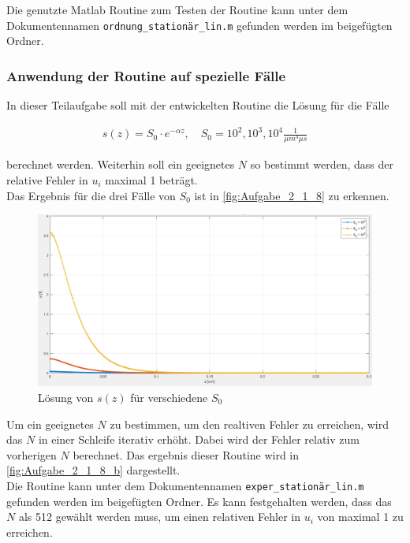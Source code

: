 \documentclass[
	pagesize,
	fontsize=12pt,
	paper=a4,
	oneside,
   reqno
]{scrartcl}
\begin{document}
Die genutzte Matlab Routine zum Testen der Routine kann unter dem Dokumentennamen \texttt{ordnung\_stationär\_lin.m} gefunden werden im beigefügten Ordner.

\subsubsection{Anwendung der Routine auf spezielle Fälle}

In dieser Teilaufgabe soll mit der entwickelten Routine die Lösung für die Fälle

\begin{align*}
   s(z) = S_0 \cdot e^{-\alpha z}, \quad S_0 = 10^2, 10^3, 10^4 \frac{1}{\mu m^3 \mu s}
\end{align*}

berechnet werden. Weiterhin soll ein geeignetes $N$ so bestimmt werden, dass der relative Fehler in $u_i$ maximal 1\textperthousand{} beträgt. \\

Das Ergebnis für die drei Fälle von $S_0$ ist in \autoref{fig:Aufgabe_2_1_8} zu erkennen.

\begin{figure}[H]
   \centering
   \includegraphics[width=1\textwidth]{Bilder/Aufgabe_2_1_8.png}
   \caption[Lösung von $s(z)$]{Lösung von $s(z)$ für verschiedene $S_0$}
   \label{fig:Aufgabe_2_1_8}
\end{figure}

Um ein geeignetes $N$ zu bestimmen, um den realtiven Fehler zu erreichen, wird das $N$ in einer Schleife iterativ erhöht. Dabei wird der Fehler relativ zum vorherigen $N$ berechnet. Das ergebnis dieser Routine wird in \autoref{fig:Aufgabe_2_1_8_b} dargestellt. \\
Die Routine kann unter dem Dokumentennamen \texttt{exper\_stationär\_lin.m} gefunden werden im beigefügten Ordner. Es kann festgehalten werden, dass das $N$ als 512 gewählt werden muss, um einen relativen Fehler in $u_i$ von maximal 1\textperthousand{} zu erreichen.
\end{document}
